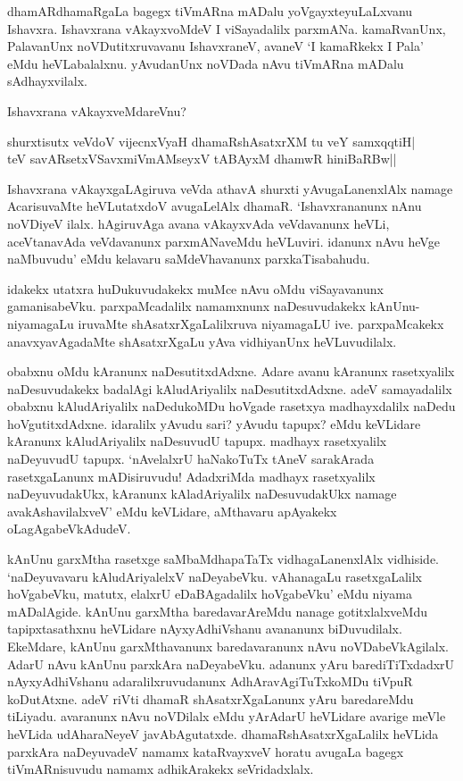 dhamARdhamaRgaLa bagegx tiVmARna mADalu yoVgayxteyuLaLxvanu Ishavxra. Ishavxrana vAkayxvoMdeV I viSayadalilx parxmANa. kamaRvanUnx, PalavanUnx noVDutitxruvavanu IshavxraneV, avaneV `I kamaRkekx I Pala' eMdu heVLabalalxnu. yAvudanUnx noVDada nAvu tiVmARna mADalu sAdhayxvilalx.

Ishavxrana vAkayxveMdareVnu?

\begin{shloka}
shurxtisutx veVdoV vijecnxVyaH dhamaRshAsatxrXM tu veY samxqqtiH|\\
teV savARsetxVSavxmiVmAMseyxV tABAyxM dhamwR hiniBaRBw||
\end{shloka}

Ishavxrana vAkayxgaLAgiruva veVda athavA shurxti yAvugaLanenxlAlx namage AcarisuvaMte heVLutatxdoV avugaLelAlx dhamaR. `Ishavxrananunx nAnu noVDiyeV ilalx. hAgiruvAga avana vAkayxvAda veVdavanunx heVLi, aceVtanavAda veVdavanunx parxmANaveMdu heVLuviri. idanunx nAvu heVge naMbuvudu' eMdu kelavaru saMdeVhavanunx parxkaTisabahudu.

idakekx utatxra huDukuvudakekx muMce nAvu oMdu viSayavanunx gamanisabeVku. parxpaMcadalilx namamxnunx naDesuvudakekx kAnUnu-niyamagaLu iruvaMte shAsatxrXgaLalilxruva niyamagaLU ive. parxpaMcakekx anavxyavAgadaMte shAsatxrXgaLu yAva vidhiyanUnx heVLuvudilalx.

obabxnu oMdu kAranunx naDesutitxdAdxne. Adare avanu kAranunx rasetxyalilx naDesuvudakekx badalAgi kAludAriyalilx naDesutitxdAdxne. adeV samayadalilx obabxnu kAludAriyalilx naDedukoMDu hoVgade rasetxya madhayxdalilx naDedu hoVgutitxdAdxne. idaralilx yAvudu sari? yAvudu tapupx? eMdu keVLidare kAranunx kAludAriyalilx naDesuvudU tapupx. madhayx rasetxyalilx naDeyuvudU tapupx. `nAvelalxrU haNakoTuTx tAneV sarakArada rasetxgaLanunx mADisiruvudu! AdadxriMda madhayx rasetxyalilx naDeyuvudakUkx, kAranunx kAladAriyalilx naDesuvudakUkx namage avakAshavilalxveV' eMdu keVLidare, aMthavaru apAyakekx oLagAgabeVkAdudeV.

kAnUnu garxMtha rasetxge saMbaMdhapaTaTx vidhagaLanenxlAlx vidhiside. `naDeyuvavaru kAludAriyalelxV naDeyabeVku. vAhanagaLu rasetxgaLalilx hoVgabeVku, matutx, elalxrU eDaBAgadalilx hoVgabeVku' eMdu niyama mADalAgide. kAnUnu garxMtha baredavarAreMdu nanage gotitxlalxveMdu tapipxtasathxnu heVLidare nAyxyAdhiVshanu avananunx biDuvudilalx. EkeMdare, kAnUnu garxMthavanunx baredavaranunx nAvu noVDabeVkAgilalx. AdarU nAvu kAnUnu parxkAra naDeyabeVku. adanunx yAru barediTiTxdadxrU nAyxyAdhiVshanu adaralilxruvudanunx AdhAravAgiTuTxkoMDu tiVpuR koDutAtxne. adeV riVti dhamaR shAsatxrXgaLanunx yAru baredareMdu tiLiyadu. avaranunx nAvu noVDilalx eMdu yArAdarU heVLidare avarige meVle heVLida udAharaNeyeV javAbAgutatxde. dhamaRshAsatxrXgaLalilx heVLida parxkAra naDeyuvadeV namamx kataRvayxveV horatu avugaLa bagegx tiVmARnisuvudu namamx adhikArakekx seVridadxlalx.

